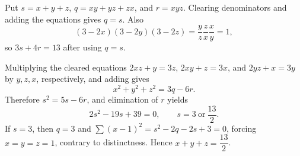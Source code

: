 Put $s=x+y+z$, $q=xy+yz+zx$, and $r=xyz$. Clearing denominators and adding the equations gives $q=s$. Also
\[
(3-2x)(3-2y)(3-2z)=\dfrac{y}{z}\dfrac{z}{x}\dfrac{x}{y}=1,
\]
so $3s+4r=13$ after using $q=s$.

Multiplying the cleared equations $2xz+y=3z$, $2xy+z=3x$, and $2yz+x=3y$ by $y,z,x$, respectively, and adding gives
\[
x^2+y^2+z^2=3q-6r.
\]
Therefore $s^2=5s-6r$, and elimination of $r$ yields
\[
2s^2-19s+39=0,\qquad s=3\ \text{or}\ \dfrac{13}{2}.
\]
If $s=3$, then $q=3$ and $\sum(x-1)^2=s^2-2q-2s+3=0$, forcing $x=y=z=1$, contrary to distinctness. Hence $\boxed{x+y+z=\dfrac{13}{2}}$.
